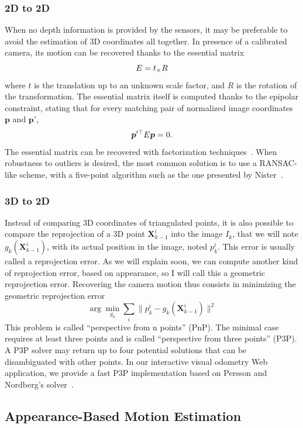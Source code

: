\subsubsection{2D to 2D}%
\label{ssub:2d_to_2d}

When no depth information is provided by the sensors,
it may be preferable to avoid the estimation of 3D coordinates all together.
In presence of a calibrated camera, its motion can be recovered
thanks to the essential matrix
\[
	E = {t}_{\times}R
\]
where $t$ is the translation up to an unknown scale factor,
and $R$ is the rotation of the transformation.
The essential matrix itself is computed thanks to the epipolar constraint,
stating that for every matching pair of normalized image coordinates
$\bm{p}$ and $\bm{p}'$,
\[
	\bm{p}'^{\top}E\bm{p} = 0.
\]
The essential matrix can be recovered with factorization techniques~\cite{longuet1981computer}.
When robustness to outliers is desired,
the most common solution is to use a RANSAC-like scheme,
with a five-point algorithm such as the one presented by Nister~\cite{nister2003efficient}.

\subsubsection{3D to 2D}%
\label{ssub:3d_to_2d}

Instead of comparing 3D coordinates of triangulated points,
it is also possible to compare the reprojection of a 3D point $\bm{X}_{k-1}^i$
into the image $I_k$, that we will note $g_k(\bm{X}_{k-1}^i)$,
with its actual position in the image, noted $p_k^i$.
This error is usually called a reprojection error.
As we will explain soon, we can compute another kind of reprojection error,
based on appearance, so I will call this a geometric reprojection error.
Recovering the camera motion thus consists in minimizing the geometric reprojection error
\[
	\arg \min_{g_k} \sum_i \| p_k^i - g_k(\bm{X}_{k-1}^i) \|^2
\]
This problem is called ``perspective from n points'' (PnP).
The minimal case requires at least three points and is called
``perspective from three points'' (P3P).
A P3P solver may return up to four potential solutions
that can be disambiguated with other points.
In our interactive visual odometry Web application,
we provide a fast P3P implementation based on
Persson and Nordberg's solver~\cite{persson2018lambda}.

\subsection{Appearance-Based Motion Estimation}%
\label{sub:appearance-based}

